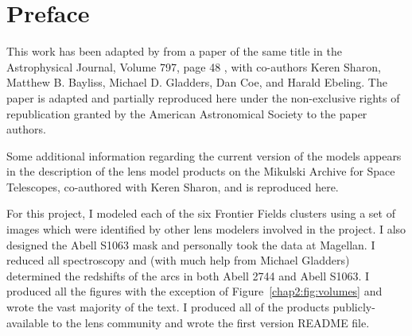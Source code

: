 \section{Preface}

%

This work has been adapted by from a paper of the same title in the Astrophysical Journal, Volume 797, page 48 \citep{Johnson:2014tg}, with co-authors Keren Sharon, Matthew B. Bayliss, Michael D. Gladders, Dan Coe, and Harald Ebeling. The paper is adapted and partially reproduced here under the non-exclusive rights of republication granted by the American Astronomical Society to the paper authors.

Some additional information regarding the current version of the models appears in the description of the lens model products on the Mikulski Archive for Space Telescopes, co-authored with Keren Sharon, and is reproduced here.

For this project, I modeled each of the six Frontier Fields clusters using a set of images which were identified by other lens modelers involved in the project. I also designed the Abell S1063 mask and personally took the data at Magellan. I reduced all spectroscopy and (with much help from Michael Gladders) determined the redshifts of the arcs in both Abell 2744 and Abell S1063. I produced all the figures with the exception of Figure~\ref{chap2:fig:volumes} and wrote the vast majority of the text. I produced all of the products publicly-available to the lens community and wrote the first version README file.

